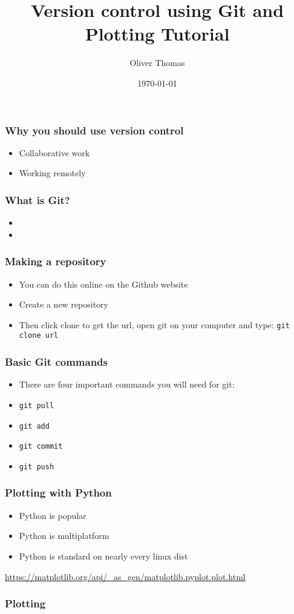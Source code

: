 \documentclass{beamer}
\title{Version control using Git and Plotting Tutorial}
\author{Oliver Thomas}
\institute{Quantum Engineering CDT \\ University of Bristol}
\date{\today}
\begin{document}
\frame{\titlepage}

\begin{frame}
\frametitle{Why you should use version control}
\begin{itemize}
\item Collaborative work  
\item Working remotely
\end{itemize}
\end{frame}

\begin{frame}
\frametitle{What is Git?}
\begin{itemize}
\item  
\item
\end{itemize}
\end{frame}

\begin{frame}
\frametitle{Making a repository}
\begin{itemize}
\item You can do this online on the Github website   
\item Create a new repository
\item Then click clone to get the url, open git on your computer and type: 
	\texttt{git clone url}
\end{itemize}
\end{frame}

\begin{frame}
\frametitle{Basic Git commands}
\begin{itemize}
	\item There are four important commands you will need for git:
	\item \texttt{git pull}
	\item \texttt{git add}
	\item \texttt{git commit}
	\item \texttt{git push}
\end{itemize}
\end{frame}

\begin{frame}
\frametitle{Plotting with Python} 
\begin{itemize}
	\item Python is popular
	\item Python is multiplatform
	\item Python is standard on nearly every linux dist
\end{itemize}
\url{https://matplotlib.org/api/_as_gen/matplotlib.pyplot.plot.html}
\end{frame}

\begin{frame}
\frametitle{Plotting}
\end{frame}
\end{document}
